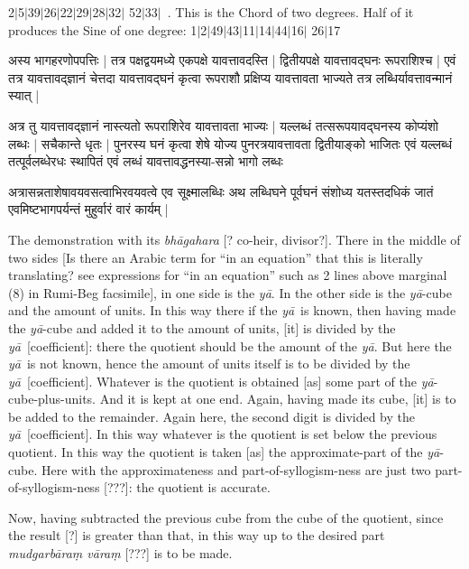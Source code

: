 \documentclass[12pt]{book}
\let\*=\d
\def\ya{\textit{y\=a}}
\def\danda{$|$}
\begin{document}
2\danda 5\danda 39\danda 26\danda 22\danda 29\danda 28\danda 32\danda
52\danda 33\danda\ . This is the Chord of two degrees. Half of it produces the
Sine of one degree: 
1\danda 2\danda 49\danda 43\danda 11\danda 14\danda 44\danda 16\danda
26\danda 17 

\newpage

{\s अस्य भागहरणोपपत्तिः |
तत्र पक्षद्वयमध्ये एकपक्षे यावत्तावदस्ति |
द्वितीयपक्षे यावत्तावद्घनः रूपराशिश्च |
एवं तत्र यावत्तावद्ज्ञानं चेत्तदा यावत्तावद्घनं कृत्वा
रूपराशौ प्रक्षिप्य यावत्तावता भाज्यते तत्र लब्धिर्यावत्तावन्मानं स्यात् |

अत्र तु यावत्तावद्ज्ञानं नास्त्यतो रूपराशिरेव यावत्तावता भाज्यः |
यल्लब्धं तत्सरूपयावद्घनस्य कोप्यंशो लब्धः |
सचैकान्ते धृतः | पुनरस्य घनं कृत्वा शेषे
योज्य पुनरत्रयावत्तावता द्वितीयाङ्को भाजितः एवं यल्लब्धं तत्पूर्वलब्धेरधः स्थापितं एवं लब्धं यावत्तावद्धनस्या-सन्नो भागो लब्धः

अत्रासन्नताशेषावयवसत्वाभिरवयवत्वे एव सूक्ष्मालब्धिः अथ लब्धिघने पूर्वघनं
संशोध्य यतस्तदधिकं जातं एवमिष्टभागपर्यन्तं मुहुर्वारं वारं कार्यम् |}

\newpage

The demonstration with its \textit{bh\=agahara} [? co-heir, divisor?]. There in 
the middle of two sides [Is there an Arabic term for ``in an equation'' that this
is literally translating?  see expressions for ``in an equation'' such as 2 lines
above marginal (8) in Rumi-Beg facsimile], in one side is the \ya. 
In the other side is the \ya-cube
and the amount of units. In this way there if the \ya\ is known, then having
made the \ya-cube and added it to the amount of units, [it] is divided by 
the \ya\ [coefficient]:  there the quotient should be the amount of the \ya. But here the
\ya\ is not known, hence the amount of units itself is to be divided by the \ya\
[coefficient]. 
Whatever is the quotient is obtained [as] some part of the \ya-cube-plus-units.
And it is kept at one end. Again, having made its cube, [it] is to be added
to the remainder. Again here, the second digit is divided by the \ya\ [coefficient]. In this way
whatever is the quotient is set below the previous quotient. In this way
the quotient is taken [as] the approximate-part of the \ya-cube. Here with the 
approximateness and part-of-syllogism-ness are just two part-of-syllogism-ness [???]:
the quotient is accurate. 

Now, having subtracted the previous cube from the cube of the quotient, since
the result [?] is greater than that, in this way up to the desired part 
\textit{mudgarb\=ara\*m v\=ara\*m} [???] is to be made.
\end{document}
